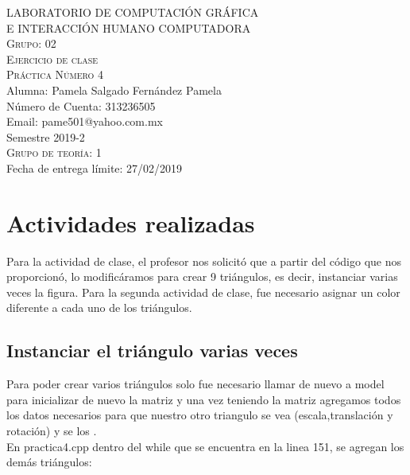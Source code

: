 \documentclass[12pt, a4paper]{article}
\begin{document}
\begin{titlepage}
		{\large LABORATORIO DE COMPUTACIÓN GRÁFICA\\ E INTERACCIÓN HUMANO COMPUTADORA}\\[.4 cm] %
		\textsc{\large Grupo: 02}\\[1.5 cm]
		\textsc{\large Ejercicio de clase}\\[0.5 cm]
		\textsc{\large Práctica Número 4}\\[1.5 cm]
		{\large Alumna: Pamela Salgado Fernández Pamela}\\[.3 cm]
		{\large Número de Cuenta: 313236505}\\[.3 cm]
		{\large Email: pame501@yahoo.com.mx}\\[1.6 cm]
		\raggedleft 
		{\large Semestre 2019-2}\\[.3 cm]
		\textsc{\large Grupo de teoría: 1}\\[.3 cm]
		{\large Fecha de entrega límite: 27/02/2019}\\[.5 cm] 


		
		\vfill %
		 
		
	\end{titlepage}
	\tableofcontents
	\newpage
	\noindent
\section{Actividades realizadas}
\justify
Para la actividad de clase, el profesor nos solicitó que a partir del código que nos proporcionó, lo modificáramos para crear 9 triángulos, es decir, instanciar varias veces la figura.
\vspace{.35cm}
Para la segunda actividad de clase, fue necesario asignar un color diferente a cada uno de los triángulos.
\justify
\subsection{Instanciar el triángulo varias veces}
Para poder crear varios triángulos solo fue necesario llamar de nuevo a model para inicializar de nuevo la matriz y una vez teniendo la matriz agregamos todos los datos necesarios para que nuestro otro triangulo se vea (escala,translación y rotación) y se los  . \\[.15cm]
En practica4.cpp dentro del while que se encuentra en la linea 151, se agregan los demás triángulos:
\end{document}
